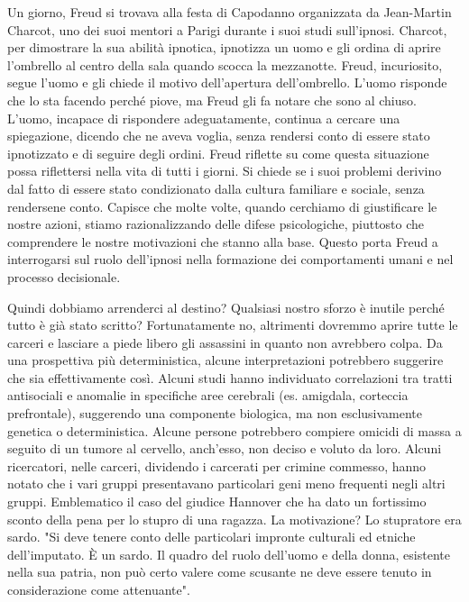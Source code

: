 \documentclass[12pt]{book} %
\begin{document}
Un giorno, Freud si trovava alla festa di Capodanno organizzata da Jean-Martin Charcot, uno dei suoi mentori a Parigi
durante i suoi studi sull'ipnosi. Charcot, per dimostrare la sua abilità ipnotica, ipnotizza un uomo e gli ordina di
aprire l'ombrello al centro della sala quando scocca la mezzanotte. Freud, incuriosito, segue l'uomo e gli chiede il
motivo dell'apertura dell'ombrello. L'uomo risponde che lo sta facendo perché piove, ma Freud gli fa notare che sono al
chiuso. L'uomo, incapace di rispondere adeguatamente, continua a cercare una spiegazione, dicendo che ne aveva voglia,
senza rendersi conto di essere stato ipnotizzato e di seguire degli ordini. Freud riflette su come questa situazione
possa riflettersi nella vita di tutti i giorni. Si chiede se i suoi problemi derivino dal fatto di essere stato
condizionato dalla cultura familiare e sociale, senza rendersene conto. Capisce che molte volte, quando cerchiamo di
giustificare le nostre azioni, stiamo razionalizzando delle difese psicologiche, piuttosto che
comprendere le nostre motivazioni che stanno alla base. Questo porta Freud a interrogarsi sul ruolo dell'ipnosi nella
formazione dei comportamenti umani e nel processo decisionale.

Quindi dobbiamo arrenderci al destino? Qualsiasi nostro sforzo è inutile perché tutto è già stato scritto?
Fortunatamente no, altrimenti dovremmo aprire tutte le carceri e lasciare a piede libero gli assassini in quanto non
avrebbero colpa. Da una prospettiva più deterministica, alcune interpretazioni potrebbero suggerire che sia effettivamente così. Alcuni studi hanno individuato correlazioni tra tratti antisociali e anomalie in specifiche aree cerebrali (es. amigdala, corteccia prefrontale), suggerendo una componente biologica, ma non esclusivamente genetica o deterministica. 
Alcune persone potrebbero compiere omicidi di massa a
seguito di un tumore al cervello, anch'esso, non deciso e voluto da loro. Alcuni ricercatori,
nelle carceri, dividendo i carcerati per crimine commesso, hanno notato che i vari gruppi presentavano particolari geni
meno frequenti negli altri gruppi. Emblematico il caso del giudice Hannover che ha dato un fortissimo sconto della pena
per lo stupro di una ragazza. La motivazione? Lo stupratore era sardo. "Si deve tenere conto delle
particolari impronte culturali ed etniche dell'imputato. È un sardo. Il quadro del ruolo dell'uomo e della donna,
esistente nella sua patria, non può certo valere come scusante ne deve essere tenuto in considerazione come attenuante".
\end{document}
